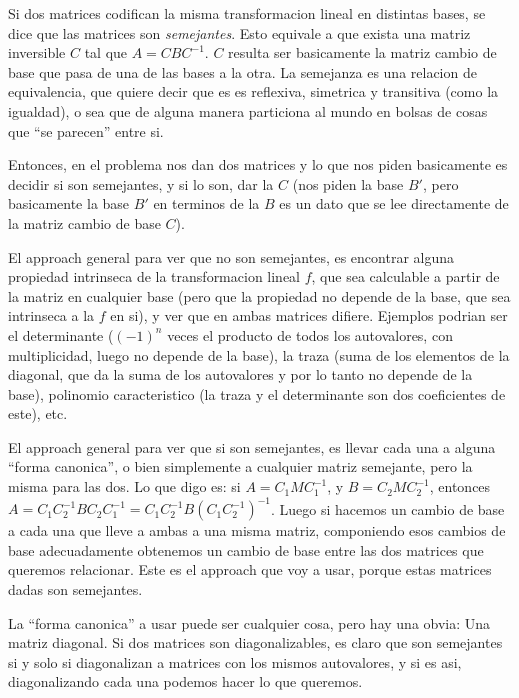 \documentclass{article}
\begin{document}
Si dos matrices codifican la misma transformacion lineal en distintas bases, se dice que las matrices son \textit{semejantes}.
Esto equivale a que exista una matriz inversible $C$ tal que $A = CBC^{-1}$. $C$ resulta ser basicamente la matriz cambio de base
que pasa de una de las bases a la otra. La semejanza es una relacion de equivalencia, que quiere decir que es es reflexiva,
simetrica y transitiva (como la igualdad), o sea que de alguna manera particiona al mundo en bolsas de cosas que ``se parecen''
entre si.

Entonces, en el problema nos dan dos matrices y lo que nos piden basicamente es decidir si son semejantes, y si lo son, dar la $C$
(nos piden la base $B'$, pero basicamente la base $B'$ en terminos de la $B$ es un dato que se lee directamente de la matriz cambio
de base $C$).

El approach general para ver que no son semejantes, es encontrar alguna propiedad intrinseca de la transformacion lineal $f$, que sea
calculable a partir de la matriz en cualquier base (pero que la propiedad no depende de la base, que sea intrinseca a la $f$ en si),
y ver que en ambas matrices difiere. Ejemplos podrian ser el determinante ($(-1)^n$ veces el producto de todos los autovalores, con multiplicidad, luego
no depende de la base), la traza (suma de los elementos de la diagonal, que da la suma de los autovalores y por lo tanto no depende
de la base), polinomio caracteristico (la traza y el determinante son dos coeficientes de este), etc.

El approach general para ver que si son semejantes, es llevar cada una a alguna ``forma canonica'', o bien simplemente a cualquier matriz
semejante, pero la misma para las dos. Lo que digo es: si $A = C_1MC_1^{-1}$, y $B = C_2MC_2^{-1}$, entonces $A = C_1C_2^{-1}BC_2C_1^{-1} =
C_1C_2^{-1}B(C_1C_2^{-1})^{-1}$. Luego si hacemos un cambio de base a cada una que lleve a ambas a una misma matriz, componiendo esos
cambios de base adecuadamente obtenemos un cambio de base entre las dos matrices que queremos relacionar. Este es el approach que
voy a usar, porque estas matrices dadas son semejantes.

La ``forma canonica'' a usar puede ser cualquier cosa, pero hay una obvia: Una matriz diagonal. Si dos matrices son diagonalizables, es
claro que son semejantes si y solo si diagonalizan a matrices con los mismos autovalores, y si es asi, diagonalizando cada una podemos
hacer lo que queremos.
\end{document}
